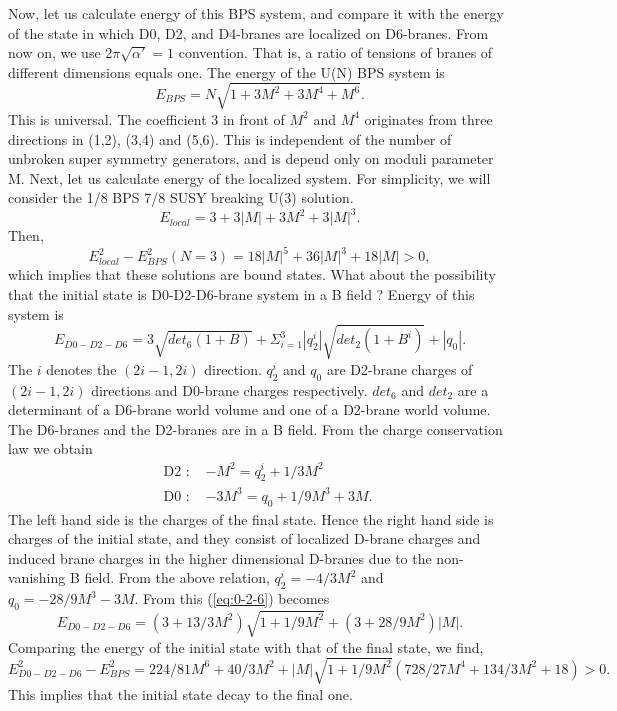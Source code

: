 \documentclass[a4paper,12pt]{article}
\begin{document}
Now, let us calculate energy of this BPS system, and compare it with the energy of the state in which D0, D2, and D4-branes are localized on D6-branes. From now on, we use $ 2\pi \sqrt{\alpha'} = 1 $ convention. That is, a ratio of  tensions of branes of different dimensions equals one. The energy of the U(N) BPS system is
\begin{equation}
E_{BPS}=N\sqrt{1+3M^2+3M^4+M^6}.
\end{equation} 
This is universal. The coefficient 3 in front of $M^2$ and $M^4$ originates from three directions in (1,2), (3,4) and (5,6). This is independent of the number of unbroken super symmetry generators, and is depend only on moduli parameter M. Next, let us calculate energy of the localized system. For simplicity, we will consider the 1/8 BPS 7/8 SUSY breaking U(3) solution. 
\begin{equation}
E_{local}=3+3|M|+3M^2+3|M|^3. 
\end{equation}
Then,
\begin{equation}
E_{local}^2-E_{BPS}^2(N=3) = 18|M|^5+36|M|^3+18|M|>0,
\end{equation}
which implies that these solutions are bound states. What about the possibility that the initial state is D0-D2-D6-brane system in a B field ? Energy of this system is 
\begin{equation}
E_{D0-D2-D6}= 3 \sqrt{det_6 (1+B)} + \Sigma_{i=1}^{3}|q_2^i| \sqrt{det_2(1+B^i)} +|q_0|. \label{eq:0-2-6}
\end{equation}
The $i$ denotes the $(2i-1,2i)$ direction. $q_2^i$ and $q_0$ are D2-brane charges of $(2i-1,2i)$ directions and D0-brane charges respectively. $det_6$ and $det_2$ are a determinant of a D6-brane world volume and one of a D2-brane world volume. The D6-branes and the D2-branes are in a B field. From the charge conservation law we obtain
\begin{eqnarray*}
&\mbox{ D2 : }& -M^2  = q_2^i + 1/3M^2 \\
&\mbox{ D0 : }& -3M^3 = q_0 + 1/9M^3 + 3M.
\end{eqnarray*}
The left hand side is the charges of the final state. Hence the right hand side is charges of the initial state, and they consist of localized D-brane charges and induced brane charges in the higher dimensional D-branes due to the non-vanishing B field. From the above relation, $q_2^i=-4/3M^2$ and $q_0=-28/9M^3-3M.$ From this (\ref{eq:0-2-6}) becomes
\begin{equation}
E_{D0-D2-D6}= (3+13/3M^2)\sqrt{1+1/9M^2} + (3+28/9M^2)|M|.
\end{equation}
Comparing the energy of the initial state with that of the final state, we find,
\[
E_{D0-D2-D6}^2-E_{BPS}^2 = 224/81M^6+40/3M^2+|M|\sqrt{1+1/9M^2}(728/27M^4+134/3M^2+18) > 0.
\]
This implies that the initial state decay to the final one.
\end{document}
